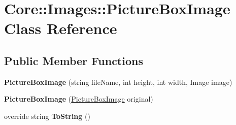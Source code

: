 \hypertarget{class_core_1_1_images_1_1_picture_box_image}{
\section{Core::Images::PictureBoxImage Class Reference}
\label{class_core_1_1_images_1_1_picture_box_image}
}
\subsection*{Public Member Functions}
\begin{DoxyCompactItemize}
\item 
\hypertarget{class_core_1_1_images_1_1_picture_box_image_a374fd6af059cb4cfd57ea034647b3f2e}{
{\bfseries PictureBoxImage} (string fileName, int height, int width, Image image)}
\label{class_core_1_1_images_1_1_picture_box_image_a374fd6af059cb4cfd57ea034647b3f2e}

\item 
\hypertarget{class_core_1_1_images_1_1_picture_box_image_ac65f665745c38330485bebdf91679618}{
{\bfseries PictureBoxImage} (\hyperlink{class_core_1_1_images_1_1_picture_box_image}{PictureBoxImage} original)}
\label{class_core_1_1_images_1_1_picture_box_image_ac65f665745c38330485bebdf91679618}

\item 
\hypertarget{class_core_1_1_images_1_1_picture_box_image_a4ad1d48954f3b11d80a2678ef1336e70}{
override string {\bfseries ToString} ()}
\label{class_core_1_1_images_1_1_picture_box_image_a4ad1d48954f3b11d80a2678ef1336e70}

\end{DoxyCompactItemize}
